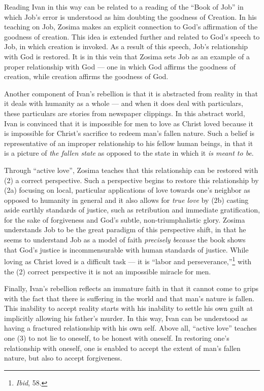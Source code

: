 Reading Ivan in this way can be related to a reading of the ``Book of Job'' in which Job's error is understood as him doubting the goodness of Creation. In his teaching on Job, Zosima makes an explicit connection to God's affirmation of the goodness of creation. This idea is extended further and related to God's speech to Job, in which creation is invoked. As a result of this speech, Job's relationship with God is restored. It is in this vein that Zosima sets Job as an example of a proper relationship with God --- one in which God affirms the goodness of creation, while creation affirms the goodness of God.

Another component of Ivan's rebellion is that it is abstracted from reality in that it deals with humanity as a whole --- and when it does deal with particulars, these particulars are stories from newspaper clippings. In this abstract world, Ivan is convinced that it is impossible for men to love as Christ loved because it is impossible for Christ's sacrifice to redeem man's fallen nature. Such a belief is representative of an improper relationship to his fellow human beings, in that it is a picture of \emph{the fallen state} as opposed to the state in which it \emph{is meant to be}. 

Through ``active love'', Zosima teaches that this relationship can be restored with (2) a correct perspective. Such a perspective begins to restore this relationship by (2a) focusing on local, particular applications of love towards one's neighbor as opposed to humanity in general and it also allows for \emph{true love} by (2b) casting aside earthly standards of justice, such as retribution and immediate gratification, for the sake of forgiveness and God's subtle, non-triumphalistic glory. Zosima understands Job to be the great paradigm of this perspective shift, in that he seems to understand Job as a model of faith \emph{precisely because} the book shows that God's justice is incommensurable with human standards of justice. While loving as Christ loved is a difficult task --- it is ``labor and perseverance,''\footnote{\emph{Ibid}, 58.} with the (2) correct perspective it is not an impossible miracle for men. 

Finally, Ivan's rebellion reflects an immature faith in that it cannot come to grips with the fact that there is suffering in the world and that man's nature is fallen. This inability to accept reality starts with his inability to settle his own guilt at implicitly allowing his father's murder. In this way, Ivan can be understood as having a fractured relationship with his own self. Above all, ``active love'' teaches one (3) to not lie to oneself, to be honest with oneself. In restoring one's relationship with oneself, one is enabled to accept the extent of man's fallen nature, but also to accept forgiveness. 


